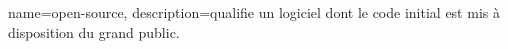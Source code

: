\makeglossaries

{
	name=open-source,
	description={qualifie un logiciel dont le code initial est mis à disposition du grand public.}
}